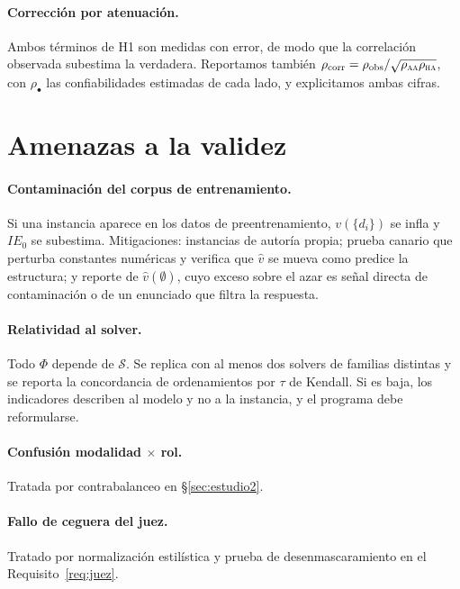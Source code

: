 \documentclass[11pt,a4paper]{article}
\theoremstyle{definition}
\theoremstyle{plain}
\theoremstyle{remark}
\newcommand{\solver}{\mathcal{S}}
\newcommand{\modAA}{\textsc{aa}}
\newcommand{\modHA}{\textsc{ha}}
\begin{document}
\paragraph{Corrección por atenuación.} Ambos términos de H1 son medidas con error,
de modo que la correlación observada subestima la verdadera. Reportamos también
$\rho_{\text{corr}}=\rho_{\text{obs}}/\sqrt{\rho_{\modAA}\rho_{\modHA}}$, con
$\rho_{\bullet}$ las confiabilidades estimadas de cada lado, y explicitamos ambas
cifras.

\section{Amenazas a la validez}\label{sec:amenazas}

\paragraph{Contaminación del corpus de entrenamiento.} Si una instancia aparece en
los datos de preentrenamiento, $v(\{d_i\})$ se infla y $IE_0$ se subestima.
Mitigaciones: instancias de autoría propia; prueba canario que perturba constantes
numéricas y verifica que $\hat v$ se mueva como predice la estructura; y reporte
de $\hat v(\emptyset)$, cuyo exceso sobre el azar es señal directa de
contaminación o de un enunciado que filtra la respuesta.

\paragraph{Relatividad al solver.} Todo $\Phi$ depende de $\solver$. Se replica
con al menos dos solvers de familias distintas y se reporta la concordancia de
ordenamientos por $\tau$ de Kendall. Si es baja, los indicadores describen al
modelo y no a la instancia, y el programa debe reformularse.

\paragraph{Confusión modalidad $\times$ rol.} Tratada por contrabalanceo en
§\ref{sec:estudio2}.

\paragraph{Fallo de ceguera del juez.} Tratado por normalización estilística y
prueba de desenmascaramiento en el Requisito~\ref{req:juez}.
\end{document}
